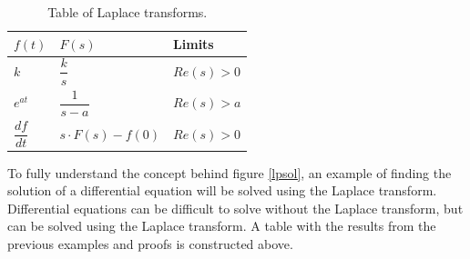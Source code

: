\begin{table}[H]
\center
\begin{tabular}{lll}
\hline
\multicolumn{1}{|l|}{$f(t)$}           & \multicolumn{1}{l|}{$F(s)$}                & \multicolumn{1}{l|}{Limits}    \\ \hline
\multicolumn{1}{|l|}{$k$}              & \multicolumn{1}{l|}{$\dfrac{k}{s}$}        & \multicolumn{1}{l|}{$Re(s)>0$} \\ \hline
\multicolumn{1}{|l|}{$e^{at}$}         & \multicolumn{1}{l|}{$\dfrac{1}{s-a}$}      & \multicolumn{1}{l|}{$Re(s)>a$} \\ \hline
\multicolumn{1}{|l|}{$\dfrac{df}{dt}$} & \multicolumn{1}{l|}{$s \cdot F(s) - f(0)$} & \multicolumn{1}{l|}{$Re(s)>0$} \\ \hline                          
\end{tabular}
\caption{Table of Laplace transforms.}
\label{lptable}
\end{table}
\noindent To fully understand the concept behind figure \ref{lpsol}, an example of finding the solution of a differential equation will be solved using the Laplace transform. Differential equations can be difficult to solve without the Laplace transform, but can be solved using the Laplace transform. A table with the results from the previous examples and proofs is constructed above.
\\
